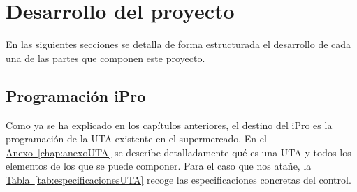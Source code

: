 
\cleardoublepage
\chapter{Desarrollo del proyecto}

\label{chap:desarrolloProyecto} %

En las siguientes secciones se detalla de forma estructurada el desarrollo de cada una de las partes que componen este proyecto.


\section{Programación iPro}
\label{sec:programacionipro}
Como ya se ha explicado en los capítulos anteriores, el destino del iPro es la programación de la UTA existente en el supermercado. En el \hyperref[chap:anexoUTA]{Anexo~\ref{chap:anexoUTA}} se describe detalladamente qué es una UTA y todos los elementos de los que se puede componer. Para el caso que nos atañe, la \hyperref[tab:especificacionesUTA]{Tabla~\ref{tab:especificacionesUTA}} recoge las especificaciones concretas del control.

